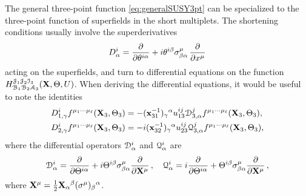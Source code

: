 \documentclass[11pt]{article}
\begin{document}
The general three-point function \eqref{eq:generalSUSY3pt} can be specialized to the three-point function of superfields in the short multiplets. The shortening conditions usually involve the superderivatives
%
\begin{equation}
D^{i}_\alpha = \pdv{\theta^{i\alpha}}+i\theta^{i\beta} \sigma^\mu_{\beta\alpha} \, \pdv{x^\mu}
\end{equation}
%
acting on the superfields, and turn to differential equations on the function $H^{{\cal J}_1{\cal J}_2 {\cal I}_3}_{{\cal B}_1{\cal B}_2{\cal A}_3}({\bf X},\Theta,U)$. When deriving the differential equations, it would be useful to note the identities
%
\begin{equation}\label{eq:chiralconF}
\begin{split}
&D_{1,\gamma}^i f^{\mu_1\cdots\mu_\ell}({\bf X}_3,\Theta_3)=-({\bf x}_{31}^{-1})_\gamma{}^\alpha u_{13}^{ij}{\cal D}^j_{3,\alpha} f^{\mu_1\cdots\mu_\ell}({\bf X}_3,\Theta_3),
\\
&D_{2,\gamma}^i f^{\mu_1\cdots\mu_\ell}({\bf X}_3,\Theta_3)=-i({\bf x}_{32}^{-1})_\gamma{}^\alpha u_{23}^{ij}{\cal Q}^j_{3,\alpha} f^{\mu_1\cdots\mu_\ell}({\bf X}_3,\Theta_3),
\end{split}
\end{equation}
%
where the differential operators ${\cal D}^{i}_\alpha$ and ${\cal Q}^{i}_\alpha$ are
%
\begin{equation}
{\cal D}^{i}_\alpha = \pdv{\Theta^{i\alpha}}+i\Theta^{i\beta} \sigma^\mu_{\beta\alpha}\pdv{{\bf X}^\mu}\,,\quad {\cal Q}^{i}_\alpha =i \pdv{\Theta^{i\alpha}}+\Theta^{i\beta} \sigma^\mu_{\beta\alpha}\pdv{{\bf X}^\mu}\,,
\end{equation}
%
where ${\bf X}^\mu=\frac{1}{2}{\bf X}_\alpha{}^\beta (\sigma^\mu)_\beta{}^\alpha$.
\end{document}
